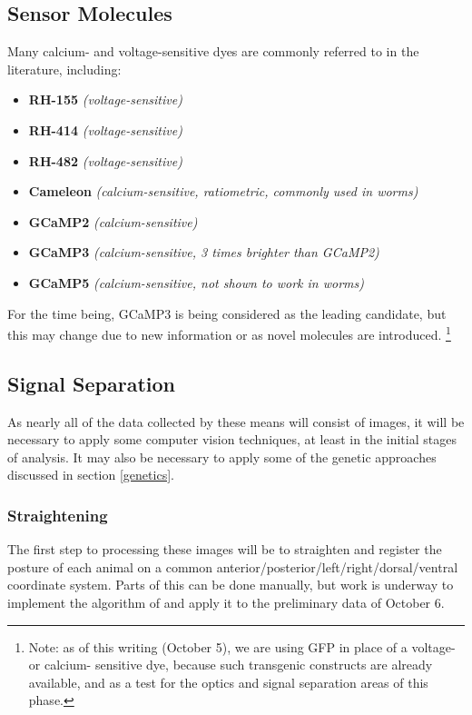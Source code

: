 \documentclass[letter,11pt]{article}
\begin{document}
\subsection{Sensor Molecules}

Many calcium- and voltage-sensitive dyes are commonly referred to in the literature,
including:
\begin{itemize}
  \item \textbf{RH-155} {\em (voltage-sensitive)}
  \item \textbf{RH-414} {\em (voltage-sensitive)}
  \item \textbf{RH-482} {\em (voltage-sensitive)}
  \item \textbf{Cameleon} {\em (calcium-sensitive, ratiometric, commonly used in worms)}
  \item \textbf{GCaMP2} {\em (calcium-sensitive)}
  \item \textbf{GCaMP3} {\em (calcium-sensitive, 3 times brighter than GCaMP2)}
  \item \textbf{GCaMP5} {\em (calcium-sensitive, not shown to work in worms)}
\end{itemize}

For the time being, GCaMP3 is being considered as the leading candidate, but
this may change due to new information or as novel molecules are introduced.%
\footnote{Note: as of this writing (October 5), we are using GFP in place of a
voltage- or calcium- sensitive dye, because such transgenic constructs are
already available, and as a test for the optics and signal separation areas
of this phase.}

\subsection{Signal Separation}

As nearly all of the data collected by these means will consist of images, it will be
necessary to apply some computer vision techniques, at least in the initial stages of
analysis. It may also be necessary to apply some of the genetic approaches discussed
in section \ref{genetics}.

\subsubsection{Straightening}

The first step to processing these images will be to straighten and register the posture
of each animal on a common anterior/posterior/left/right/dorsal/ventral coordinate system.
Parts of this can be done manually, but work is underway to implement the algorithm of
\cite{straighten} and apply it to the preliminary data of October 6.
\end{document}
